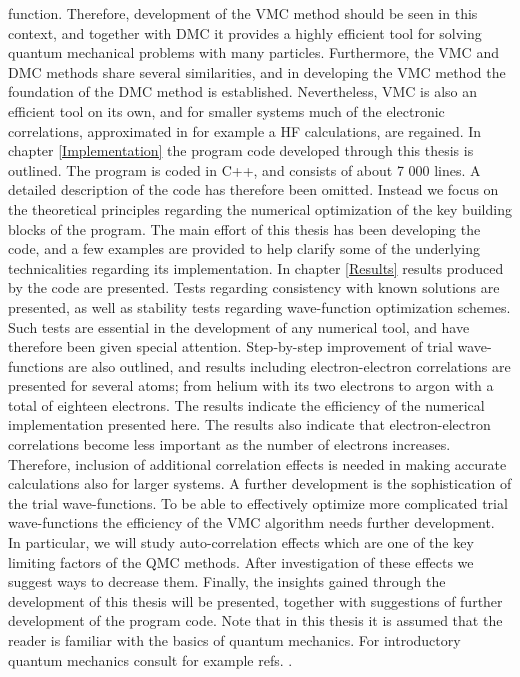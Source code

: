 function. Therefore, development of the VMC method should be seen in
this context, and together with DMC it provides a highly efficient
tool for solving quantum mechanical problems with many
particles. Furthermore, the VMC and DMC methods share 
several similarities, and in developing the VMC method the foundation of
the DMC method is established. Nevertheless, VMC is also an efficient
tool on its own, and for smaller systems much of the 
electronic correlations, approximated in for example a HF
calculations, are regained.
\newline
%
\newline
In chapter \ref{Implementation} the program code developed through this
thesis is outlined. The program is coded in C++, and consists of
about 7 000 lines. A detailed description of the code has therefore
been omitted. Instead we focus on the theoretical principles regarding
the numerical optimization of the key building blocks of the
program. The main effort of this thesis has been developing the
code, and a few examples are provided to help clarify some of the
underlying technicalities regarding its implementation.
\newline
%
\newline
In chapter \ref{Results} results produced by the code are
presented. Tests regarding consistency with known solutions are
presented, as well as stability tests regarding wave-function
optimization schemes. Such tests are essential in the development of
any numerical tool, and have therefore been given special
attention. Step-by-step improvement of trial wave-functions are
also outlined, and results including electron-electron correlations
are presented for several atoms; from helium with its two electrons to
argon with a total of eighteen electrons. The results indicate the
efficiency of the numerical implementation presented here. The results
also indicate that electron-electron correlations become
less important as the number of electrons
increases. Therefore, inclusion of additional correlation effects is
needed in making accurate calculations also for larger systems. A
further development is the sophistication of the trial wave-functions.
\newline
%
\newline
To be able to effectively optimize more complicated trial
wave-functions the efficiency of the VMC algorithm needs further
development. In particular, we will study auto-correlation effects
which are one of the key limiting factors of the QMC methods. After
investigation of these effects we suggest ways to decrease them.
\newline
%
\newline
Finally, the insights gained through the development of this
thesis will be presented, together with suggestions of further
development of the program code.
\newline
%
\newline
Note that in this thesis it is assumed that the reader is familiar
with the basics of quantum mechanics. For introductory quantum
mechanics consult for example
refs. \cite{shankar1994,hemmer1980,atkins2003,bransden1983}. 
